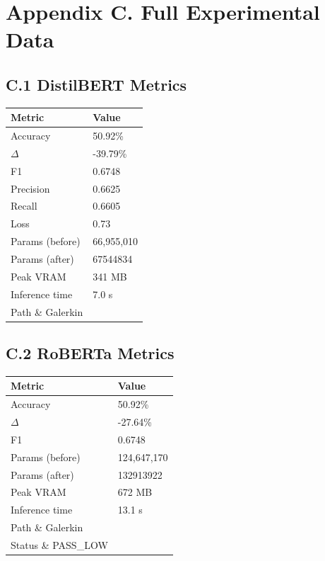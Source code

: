 
\section{Appendix C. Full Experimental Data}

\subsection{C.1 DistilBERT Metrics}

\begin{table}[H]
\centering
\small
\begin{tabular}{ll}
\toprule
\textbf{Metric} & \textbf{Value} \\
\midrule
Accuracy & 50.92\% \\
$\Delta$ & -39.79\% \\
F1 & 0.6748 \\
Precision & 0.6625 \\
Recall & 0.6605 \\
Loss & 0.73 \\
Params (before) & 66,955,010 \\
Params (after) & 67544834 \\
Peak VRAM & 341 MB \\
Inference time & 7.0 s \\
Path \& Galerkin \\
\bottomrule
\end{tabular}
\end{table}

\subsection{C.2 RoBERTa Metrics}

\begin{table}[H]
\centering
\small
\begin{tabular}{ll}
\toprule
\textbf{Metric} & \textbf{Value} \\
\midrule
Accuracy & 50.92\% \\
$\Delta$ & -27.64\% \\
F1 & 0.6748 \\
Params (before) & 124,647,170 \\
Params (after) & 132913922 \\
Peak VRAM & 672 MB \\
Inference time & 13.1 s \\
Path \& Galerkin \\
Status \& PASS\_LOW \\
\bottomrule
\end{tabular}
\end{table}

